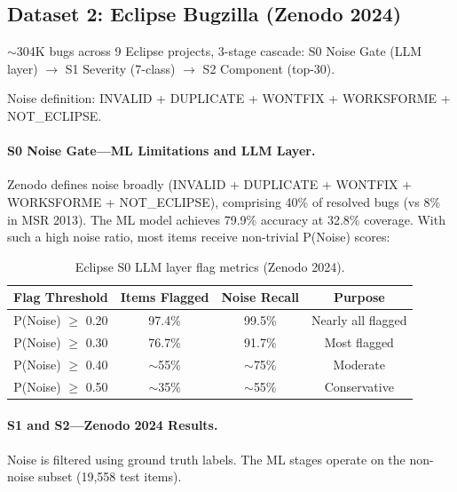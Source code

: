 \documentclass[11pt]{article}
\begin{document}
\subsection{Dataset 2: Eclipse Bugzilla (Zenodo 2024)}

$\sim$304K bugs across 9 Eclipse projects, 3-stage cascade: S0 Noise Gate (LLM layer) $\rightarrow$ S1 Severity (7-class) $\rightarrow$ S2 Component (top-30).

Noise definition: INVALID + DUPLICATE + WONTFIX + WORKSFORME + NOT\_ECLIPSE.

\paragraph{S0 Noise Gate---ML Limitations and LLM Layer.}

Zenodo defines noise broadly (INVALID + DUPLICATE + WONTFIX + WORKSFORME + NOT\_ECLIPSE), comprising 40\% of resolved bugs (vs 8\% in MSR 2013). The ML model achieves 79.9\% accuracy at 32.8\% coverage. With such a high noise ratio, most items receive non-trivial P(Noise) scores:

\begin{table}[h]
\centering
\caption{Eclipse S0 LLM layer flag metrics (Zenodo 2024).}
\label{tab:eclipse-s0-flags}
\begin{tabular}{cccc}
\toprule
\textbf{Flag Threshold} & \textbf{Items Flagged} & \textbf{Noise Recall} & \textbf{Purpose} \\
\midrule
P(Noise) $\geq$ 0.20 & 97.4\% & 99.5\% & Nearly all flagged \\
P(Noise) $\geq$ 0.30 & 76.7\% & 91.7\% & Most flagged \\
P(Noise) $\geq$ 0.40 & $\sim$55\% & $\sim$75\% & Moderate \\
P(Noise) $\geq$ 0.50 & $\sim$35\% & $\sim$55\% & Conservative \\
\bottomrule
\end{tabular}
\end{table}

\paragraph{S1 and S2---Zenodo 2024 Results.}

Noise is filtered using ground truth labels. The ML stages operate on the non-noise subset (19,558 test items).
\end{document}
